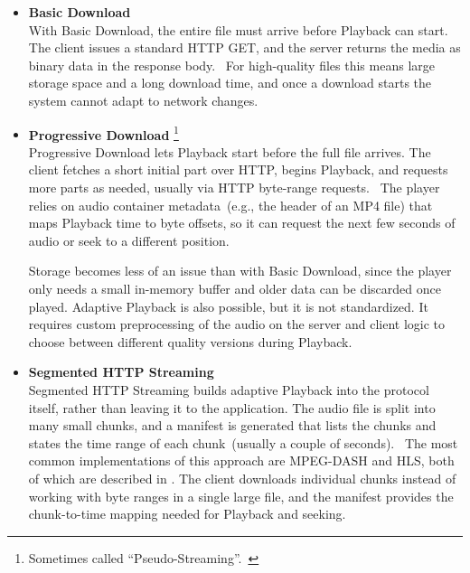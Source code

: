 \begin{itemize}
    \item \textbf{Basic Download}\\
    With Basic Download, the entire file must arrive before Playback can start.
    The client issues a standard HTTP GET, and the server returns the media as
    binary data in the response body.~\parencite{mime_octet_stream}
    For high-quality files this means large storage space and a long download
    time, and once a download starts the system cannot adapt to network changes.

    \item \textbf{Progressive Download}
    \footnote{Sometimes called ``Pseudo-Streaming''.~\parencite{pseudo_streaming}}
    \\
    Progressive Download lets Playback start before the full file arrives.
    The client fetches a short initial part over HTTP, begins Playback, and
    requests more parts as needed, usually via HTTP byte-range
    requests.~\parencite{range_http_requests}
    The player relies on audio container metadata~(e.g., the header of an MP4
    file) that maps Playback time to byte offsets, so it can request the next
    few seconds of audio or seek to a different position.~\parencite{progressive_download}

    Storage becomes less of an issue than with Basic Download, since the player
    only needs a small in-memory buffer and older data can be discarded once
    played.
    Adaptive Playback is also possible, but it is not standardized.
    It requires custom preprocessing of the audio on the server and
    client logic to choose between different quality versions during Playback.

    \item \textbf{Segmented HTTP Streaming}\label{it:streaming}\\
    Segmented HTTP Streaming builds adaptive Playback into the protocol itself,
    rather than leaving it to the application.
    The audio file is split into many small chunks, and a manifest is generated
    that lists the chunks and states the time range of each
    chunk~(usually a couple of seconds).~\parencite{dash_technical}
    The most common implementations of this approach are MPEG-DASH and HLS,
    both of which are described in .
    The client downloads individual chunks instead of working with byte ranges
    in a single large file, and the manifest provides the chunk-to-time mapping
    needed for Playback and seeking.


\end{itemize}
